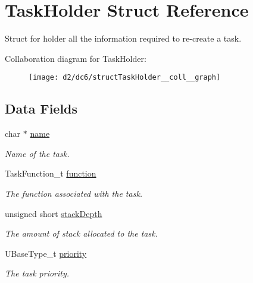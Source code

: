 \hypertarget{structTaskHolder}{}\section{Task\+Holder Struct Reference}
\label{structTaskHolder}


Struct for holder all the information required to re-\/create a task.  




Collaboration diagram for Task\+Holder\+:\nopagebreak
\begin{figure}[H]
\begin{center}
\leavevmode
\texttt{[image: d2/dc6/structTaskHolder\_\_coll\_\_graph]}
\end{center}
\end{figure}
\subsection*{Data Fields}
\begin{DoxyCompactItemize}
\item 
char $\ast$ \hyperlink{structTaskHolder_a1cd66557649e19026e3ce6fa58fe7725}{name}\hypertarget{structTaskHolder_a1cd66557649e19026e3ce6fa58fe7725}{}\label{structTaskHolder_a1cd66557649e19026e3ce6fa58fe7725}

\begin{DoxyCompactList}\small\item\em Name of the task. \end{DoxyCompactList}\item 
Task\+Function\+\_\+t \hyperlink{structTaskHolder_acabbddfc114b4acdbed43ab321f33cfa}{function}\hypertarget{structTaskHolder_acabbddfc114b4acdbed43ab321f33cfa}{}\label{structTaskHolder_acabbddfc114b4acdbed43ab321f33cfa}

\begin{DoxyCompactList}\small\item\em The function associated with the task. \end{DoxyCompactList}\item 
unsigned short \hyperlink{structTaskHolder_a99ef30650dbf385f948a34d82c3f9519}{stack\+Depth}\hypertarget{structTaskHolder_a99ef30650dbf385f948a34d82c3f9519}{}\label{structTaskHolder_a99ef30650dbf385f948a34d82c3f9519}

\begin{DoxyCompactList}\small\item\em The amount of stack allocated to the task. \end{DoxyCompactList}\item 
U\+Base\+Type\+\_\+t \hyperlink{structTaskHolder_a1fe7561b26de35d8c561e94af3fc20b9}{priority}\hypertarget{structTaskHolder_a1fe7561b26de35d8c561e94af3fc20b9}{}\label{structTaskHolder_a1fe7561b26de35d8c561e94af3fc20b9}

\begin{DoxyCompactList}\small\item\em The task priority. \end{DoxyCompactList}\end{DoxyCompactItemize}


